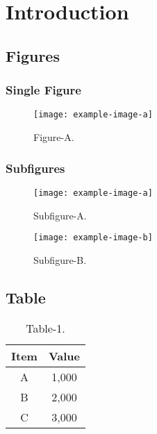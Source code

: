 

\let\clearpage\relax
\chapter{Introduction}

\section{Figures}

\subsection{Single Figure}

\begin{figure}[!htp]
    \centering
    \texttt{[image: example-image-a]}
    \caption{Figure-A.}
    \label{fig:a}
\end{figure}

\subsection{Subfigures}

\begin{figure}[!htp]
    \begin{minipage}{0.48\textwidth}
        \centering
        \texttt{[image: example-image-a]}
        \caption{Subfigure-A.}
        \label{fig:sub_a}
    \end{minipage}\hfill
    \begin{minipage}{0.48\textwidth}
        \centering
        \texttt{[image: example-image-b]}
        \caption{Subfigure-B.}
        \label{fig:sub_b}
    \end{minipage}
\end{figure}

\section{Table}

\begin{table}[!htp]
    \begin{center}
    \caption{Table-1.}
    \label{tab:tab-1}
        \begin{tabular}{cc}
            \toprule
                Item   &   Value \\
            \midrule
                A      &   1,000 \\
                B      &   2,000 \\
                C      &   3,000 \\
            \bottomrule
        \end{tabular}
    \end{center}
\end{table}

